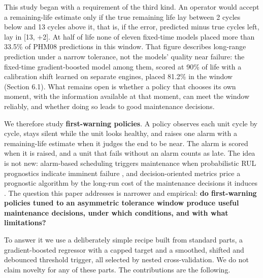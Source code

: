 \documentclass[a4paper,fleqn,doubleblind]{cas-dc}
\begin{document}
This study began with a requirement of the third kind. An operator would accept a remaining-life estimate only if the true remaining life lay between 2 cycles below and 13 cycles above it, that is, if the error, predicted minus true cycles left, lay in [\textminus{}13, +2]. At half of life none of eleven fixed-time models placed more than 33.5\% of PHM08 predictions in this window. That figure describes long-range prediction under a narrow tolerance, not the models' quality near failure: the fixed-time gradient-boosted model among them, scored at 90\% of life with a calibration shift learned on separate engines, placed 81.2\% in the window (Section 6.1). What remains open is whether a policy that chooses its own moment, with the information available at that moment, can meet the window reliably, and whether doing so leads to good maintenance decisions.

We therefore study \textbf{first-warning policies}. A policy observes each unit cycle by cycle, stays silent while the unit looks healthy, and raises one alarm with a remaining-life estimate when it judges the end to be near. The alarm is scored when it is raised, and a unit that fails without an alarm counts as late. The idea is not new: alarm-based scheduling triggers maintenance when probabilistic RUL prognostics indicate imminent failure \cite{depater2022}, and decision-oriented metrics price a prognostic algorithm by the long-run cost of the maintenance decisions it induces \cite{kamariotis2024}. The question this paper addresses is narrower and empirical: \textbf{do first-warning policies tuned to an asymmetric tolerance window produce useful maintenance decisions, under which conditions, and with what limitations?}

To answer it we use a deliberately simple recipe built from standard parts, a gradient-boosted regressor with a capped target and a smoothed, shifted and debounced threshold trigger, all selected by nested cross-validation. We do not claim novelty for any of these parts. The contributions are the following.
\end{document}
